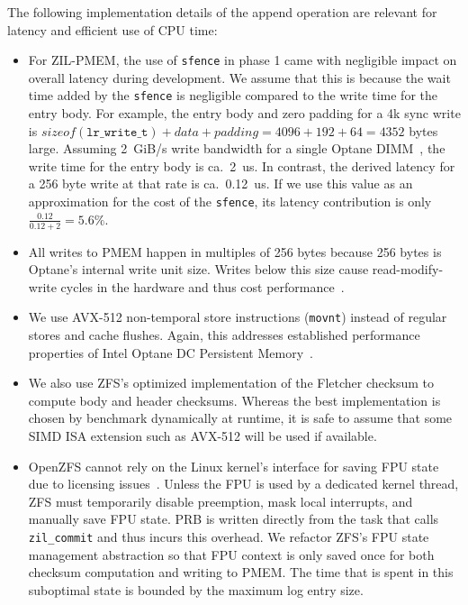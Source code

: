 \documentclass[12pt,a4paper,twoside]{book}
\begin{document}
The following implementation details of the append operation are relevant for latency and efficient use of CPU time:
\begin{itemize}[noitemsep]
    \item For ZIL-PMEM, the use of \lstinline{sfence} in phase 1 came with negligible impact on overall latency during development.
        We assume that this is because the wait time added by the \lstinline{sfence} is negligible compared to the write time for the entry body.
        For example, the entry body and zero padding for a 4k sync write is $sizeof(\mathtt{lr\_write\_t}) + data + padding = 4096 + 192 + 64 = 4352$ bytes large.
        Assuming 2~GiB/s write bandwidth for a single Optane DIMM~\cite{yangEmpiricalGuideBehavior2020}, the write time for the entry body is ca.~2~us.
        In contrast, the derived latency for a 256 byte write at that rate is ca.~0.12~us.
        If we use this value as an approximation for the cost of the \lstinline{sfence}, its latency contribution is only $\frac{0.12}{0.12 + 2} = 5.6\%$.
    \item All writes to PMEM happen in multiples of 256 bytes because 256 bytes is Optane's internal write unit size.
        Writes below this size cause read-modify-write cycles in the hardware and thus cost performance~\cite{yangEmpiricalGuideBehavior2020,zhangChameleonDBKeyvalueStore2021}.
    \item We use AVX-512 non-temporal store instructions (\lstinline{movnt}) instead of regular stores and cache flushes.
        Again, this addresses established performance properties of Intel Optane DC Persistent Memory~\cite{yangEmpiricalGuideBehavior2020}.
    \item We also use ZFS's optimized implementation of the Fletcher checksum to compute body and header checksums.
        Whereas the best implementation is chosen by benchmark dynamically at runtime, it is safe to assume that some SIMD ISA extension such as AVX-512 will be used if available.
    \item OpenZFS cannot rely on the Linux kernel's interface for saving FPU state due to licensing issues~\cite{LinuxCompatSIMD}.
        Unless the FPU is used by a dedicated kernel thread, ZFS must temporarily disable preemption, mask local interrupts, and manually save FPU state.
        PRB is written directly from the task that calls \lstinline{zil_commit} and thus incurs this overhead.
        We refactor ZFS's FPU state management abstraction so that FPU context is only saved once for both checksum computation and writing to PMEM.
        The time that is spent in this suboptimal state is bounded by the maximum log entry size.
\end{itemize}
\end{document}
